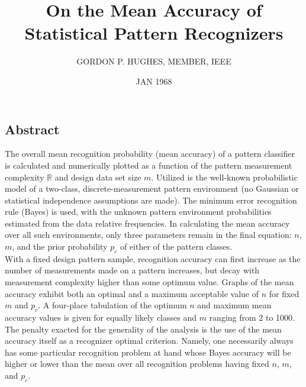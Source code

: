 \documentclass[10pt, a4paper]{article}
\title{On the Mean Accuracy of Statistical Pattern Recognizers}
\author{GORDON P. HUGHES, MEMBER, IEEE }
\date{JAN 1968}
\begin{document}
\begin{CJK*}{UTF8}{bsmi}

\maketitle

\setlength{\columnsep}{0.5cm}
\begin{multicols}{2}

\section*{Abstract}
\hspace*{1em} The overall mean recognition probability (mean accuracy) of a pattern classifier is calculated and numerically plotted as a function of the pattern measurement complexity $\mathbb{R}$ and design data set size $m$. 
Utilized is the well-known probabilistic model of a two-class, discrete-measurement pattern environment (no Gaussian or statistical independence assumptions are made). 
The minimum error recognition rule (Bayes) is used, with the unknown pattern environment probabilities estimated from the data relative frequencies. 
In calculating the mean accuracy over all such environments, only three parameters remain in the final equation: $n$, $m$, and the prior probability $p_c$ of either of the pattern classes.\\ 
\hspace*{1em} With a fixed design pattern sample, recognition accuracy can first increase as the number of measurements made on a pattern increases, but decay with measurement complexity higher than some optimum value. 
Graphs of the mean accuracy exhibit both an optimal and a maximum acceptable value of $n$ for fixed $m$ and $p_c$. A four-place tabulation of the optimum $n$ and maximum mean accuracy values is given for equally likely classes and $m$ ranging from 2 to 1000.\\
\hspace*{1em} The penalty exacted for the generality of the analysis is the use of the mean accuracy itself as a recognizer optimal criterion. 
Namely, one necessarily always has some particular recognition problem at hand whose Bayes accuracy will be higher or lower than the mean over all recognition problems having fixed $n$, $m$, and $p_c$. 


\end{multicols}
\end{CJK*}
\end{document}
